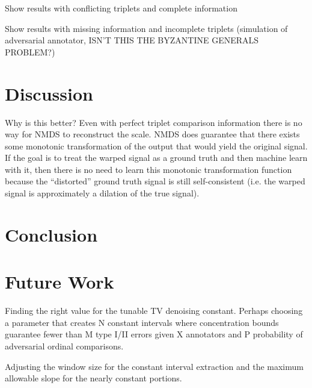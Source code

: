 \documentclass[]{article}
\begin{document}
Show results with conflicting triplets and complete information

Show results with missing information and incomplete triplets (simulation of adversarial annotator, ISN'T THIS THE BYZANTINE GENERALS PROBLEM?)

\section{Discussion}
Why is this better?  Even with perfect triplet comparison information there is no way for NMDS to reconstruct the scale.  NMDS does guarantee that there exists some monotonic transformation of the output that would yield the original signal.  If the goal is to treat the warped signal as a ground truth and then machine learn with it, then there is no need to learn this monotonic transformation function because the ``distorted'' ground truth signal is still self-consistent (i.e. the warped signal is approximately a dilation of the true signal).

\section{Conclusion}

\section{Future Work}
Finding the right value for the tunable TV denoising constant.  Perhaps choosing a parameter that creates N constant intervals where concentration bounds guarantee fewer than M type I/II errors given X annotators and P probability of adversarial ordinal comparisons.

Adjusting the window size for the constant interval extraction and the maximum allowable slope for the nearly constant portions.





\end{document}
